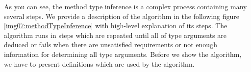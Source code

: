\par
As you can see, the method type inference is a complex process containing many several steps.
We provide a description of the algorithm \cite{online:csTypeInference} in the following figure \ref{img07:methodTypeInference} with high-level explanation of its steps.
The algorithm runs in steps which are repeated until all of type arguments are deduced or fails when there are unsatisfied requirements or not enough information for determining all type arguments.
Before we show the algorithm, we have to present definitions which are used by the algorithm.
\par
\par
